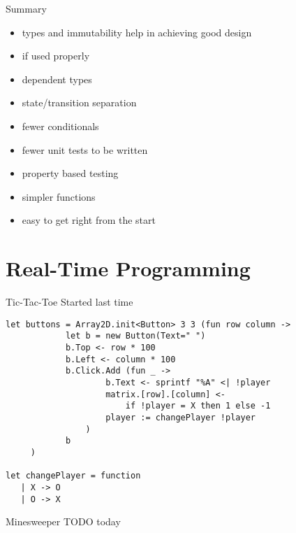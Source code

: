 \documentclass{beamer}
\begin{document}
\begin{frame}{Summary}
  \begin{itemize}[<+->]
    \item types and immutability help in achieving good design
    \item if used properly
    \item dependent types
    \item state/transition separation
    \item fewer conditionals
    \item fewer unit tests to be written
    \item property based testing
    \item simpler functions
    \item easy to get right from the start
  \end{itemize}
\end{frame}

\section{Real-Time Programming}
\frame{\tableofcontents[currentsection]}

\begin{frame}[fragile]{Tic-Tac-Toe}
  Started last time
  \pause
  \small
  \begin{verbatim}
let buttons = Array2D.init<Button> 3 3 (fun row column ->
            let b = new Button(Text=" ")
            b.Top <- row * 100
            b.Left <- column * 100
            b.Click.Add (fun _ ->
                    b.Text <- sprintf "%A" <| !player
                    matrix.[row].[column] <-
                        if !player = X then 1 else -1
                    player := changePlayer !player
                )
            b
     )

let changePlayer = function
   | X -> O
   | O -> X
  \end{verbatim}
\end{frame}

\begin{frame}{Minesweeper}
  TODO today
\end{frame}
\end{document}
